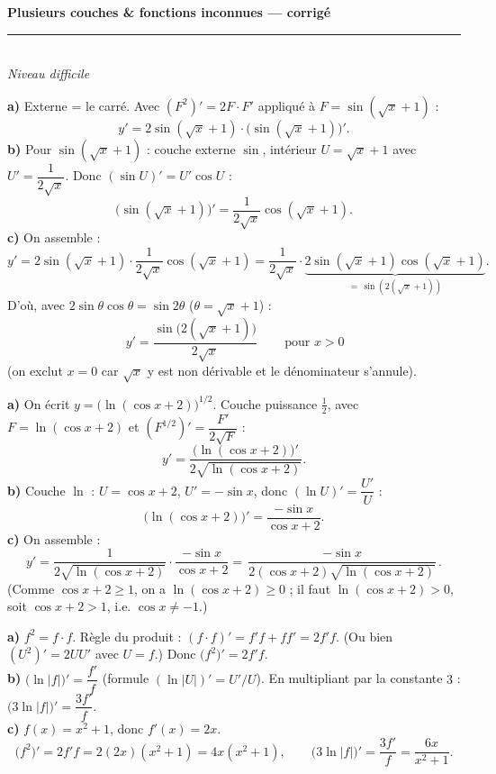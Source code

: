\pagestyle{fancy}\fancyhf{}
\fancyfoot[C]{\small\thepage}
\renewcommand{\headrulewidth}{0.8pt}



\begin{center}
{\LARGE\bfseries\color{primarydark} Plusieurs couches \& fonctions inconnues — corrigé}\\[2pt]
{\color{primary}\rule{0.5\textwidth}{1.2pt}}\\[4pt]
{\small\itshape Niveau difficile}
\end{center}
\vspace{2mm}

\begin{corr}[1 --- $y=\sin^2(\sqrt x+1)$]
\textbf{a)} Externe = le carré. Avec $(F^2)'=2F\cdot F'$ appliqué à $F=\sin(\sqrt x+1)$ :
\[
y'=2\sin(\sqrt x+1)\cdot\big(\sin(\sqrt x+1)\big)'.
\]
\textbf{b)} Pour $\sin(\sqrt x+1)$ : couche externe $\sin$, intérieur $U=\sqrt x+1$ avec
$U'=\dfrac{1}{2\sqrt x}$. Donc $(\sin U)'=U'\cos U$ :
\[
\big(\sin(\sqrt x+1)\big)'=\frac{1}{2\sqrt x}\cos(\sqrt x+1).
\]
\textbf{c)} On assemble :
\[
y'=2\sin(\sqrt x+1)\cdot\frac{1}{2\sqrt x}\cos(\sqrt x+1)
 =\frac{1}{2\sqrt x}\cdot\underbrace{2\sin(\sqrt x+1)\cos(\sqrt x+1)}_{=\,\sin(2(\sqrt x+1))}.
\]
D'où, avec $2\sin\theta\cos\theta=\sin 2\theta$ ($\theta=\sqrt x+1$) :
\[
\boxed{\,y'=\frac{\sin\big(2(\sqrt x+1)\big)}{2\sqrt x}\,}\qquad\text{pour } x>0
\]
(on exclut $x=0$ car $\sqrt x$ y est non dérivable et le dénominateur s'annule).
\end{corr}

\begin{corr}[2 --- $y=\sqrt{\ln(\cos x+2)}$]
\textbf{a)} On écrit $y=\big(\ln(\cos x+2)\big)^{1/2}$. Couche puissance $\tfrac12$, avec
$F=\ln(\cos x+2)$ et $(F^{1/2})'=\dfrac{F'}{2\sqrt F}$ :
\[
y'=\frac{\big(\ln(\cos x+2)\big)'}{2\sqrt{\ln(\cos x+2)}}.
\]
\textbf{b)} Couche $\ln$ : $U=\cos x+2$, $U'=-\sin x$, donc $(\ln U)'=\dfrac{U'}{U}$ :
\[
\big(\ln(\cos x+2)\big)'=\frac{-\sin x}{\cos x+2}.
\]
\textbf{c)} On assemble :
\[
y'=\frac{1}{2\sqrt{\ln(\cos x+2)}}\cdot\frac{-\sin x}{\cos x+2}
 =\boxed{\,\frac{-\sin x}{2(\cos x+2)\sqrt{\ln(\cos x+2)}}\,}.
\]
(Comme $\cos x+2\ge 1$, on a $\ln(\cos x+2)\ge 0$ ; il faut $\ln(\cos x+2)>0$,
soit $\cos x+2>1$, i.e. $\cos x\neq -1$.)
\end{corr}

\begin{corr}
\textbf{a)} $f^2=f\cdot f$. Règle du produit : $(f\cdot f)'=f'f+f f'=2f'f$. (Ou bien
$(U^2)'=2UU'$ avec $U=f$.) Donc $\big(f^2\big)'=2f'f$.\\[2pt]
\textbf{b)} $\big(\ln|f|\big)'=\dfrac{f'}{f}$ (formule $(\ln|U|)'=U'/U$). En multipliant par la
constante $3$ : $\big(3\ln|f|\big)'=\dfrac{3f'}{f}$.\\[2pt]
\textbf{c)} $f(x)=x^2+1$, donc $f'(x)=2x$.
\[
\big(f^2\big)'=2f'f=2(2x)(x^2+1)=4x(x^2+1),\qquad
\big(3\ln|f|\big)'=\frac{3f'}{f}=\frac{6x}{x^2+1}.
\]
\end{corr}

